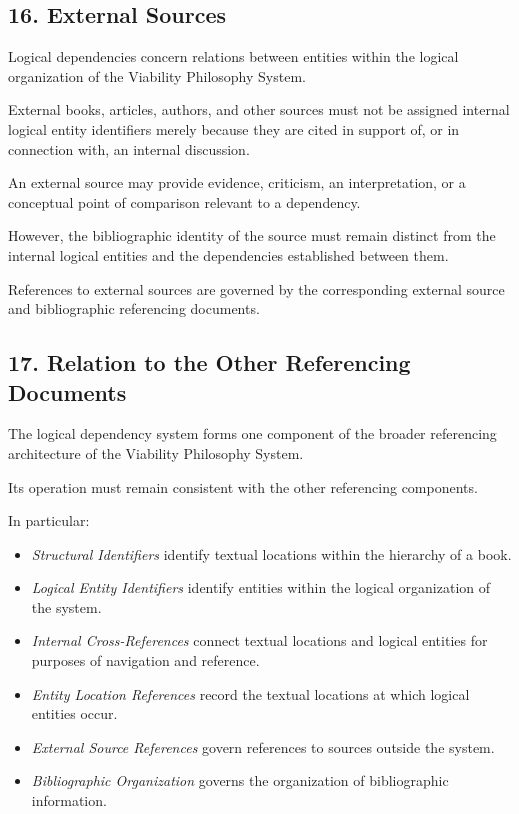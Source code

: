 \subsection*{16. External Sources}

Logical dependencies concern
relations between entities
within the logical organization
of the Viability Philosophy
System.

External books, articles,
authors, and other sources
must not be assigned internal
logical entity identifiers
merely because they are
cited in support of, or
in connection with, an
internal discussion.

An external source may
provide evidence, criticism,
an interpretation, or
a conceptual point of
comparison relevant to
a dependency.

However, the bibliographic
identity of the source
must remain distinct from
the internal logical entities
and the dependencies
established between them.

References to external
sources are governed by
the corresponding external
source and bibliographic
referencing documents.


\subsection*{17. Relation to the Other
Referencing Documents}

The logical dependency system
forms one component of
the broader referencing
architecture of the Viability
Philosophy System.

Its operation must remain
consistent with the other
referencing components.

In particular:

\begin{itemize}
    \item \textit{Structural Identifiers}
    identify textual locations
    within the hierarchy
    of a book.

    \item \textit{Logical Entity
    Identifiers} identify
    entities within the
    logical organization
    of the system.

    \item \textit{Internal
    Cross-References} connect
    textual locations and
    logical entities for
    purposes of navigation
    and reference.

    \item \textit{Entity Location
    References} record the
    textual locations at
    which logical entities
    occur.

    \item \textit{External Source
    References} govern references
    to sources outside
    the system.

    \item \textit{Bibliographic
    Organization} governs
    the organization of
    bibliographic information.
\end{itemize}

